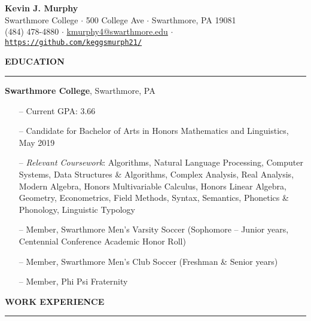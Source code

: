 \documentclass[paper=a4, fontsize=11pt]{scrartcl} %
\newcommand{\I}{--}
\newenvironment{mycenter}[1][\topsep]
  {\setlength{\topsep}{#1}\par\kern\topsep\centering}%
  {\par\kern\topsep}%
\begin{document}
\begin{mycenter}
\textbf{\LARGE Kevin J. Murphy} \\
Swarthmore College $\cdot$ 500 College Ave $\cdot$ Swarthmore, PA 19081 \\
(484) 478-4880 $\cdot$ \href{mailto:kmurphy4@swarthmore.edu}{kmurphy4@swarthmore.edu} $\cdot$ \texttt{\href{https://github.com/keggsmurph21/}{https://github.com/keggsmurph21/}}

\end{mycenter}

\begin{mycenter}[0pt]
\textsc{\textbf{EDUCATION}}
\end{mycenter}

\vspace{-3mm}
\rule{\textwidth}{0.4pt}

\textbf{Swarthmore College}, Swarthmore, PA
\begin{itemize}[topsep=0pt,noitemsep]
  \item[\I] Current GPA: 3.66
	\item[\I] Candidate for Bachelor of Arts in Honors Mathematics and Linguistics, May 2019
	\item[\I] \textit{Relevant Coursework}: Algorithms, Natural Language Processing, Computer Systems, Data Structures \& Algorithms, Complex Analysis, Real Analysis, Modern Algebra, Honors Multivariable Calculus, Honors Linear Algebra, Geometry, Econometrics, Field Methods, Syntax, Semantics, Phonetics \& Phonology, Linguistic Typology
	\item[\I] Member, Swarthmore Men's Varsity Soccer (Sophomore -- Junior years, Centennial Conference Academic Honor Roll)
  \item[\I] Member, Swarthmore Men's Club Soccer (Freshman \& Senior years)
	\item[\I] Member, Phi Psi Fraternity
\end{itemize}

\vspace{2mm}

\begin{mycenter}[0pt]
\textsc{\textbf{WORK EXPERIENCE}}
\end{mycenter}

\vspace{-3mm}
\rule{\textwidth}{0.4pt}
\end{document}

